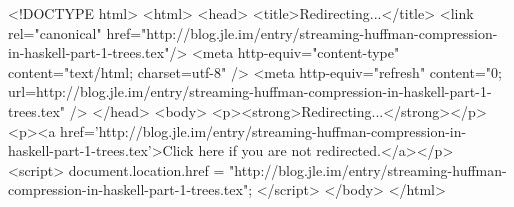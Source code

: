 <!DOCTYPE html>
<html>
<head>
<title>Redirecting...</title>
<link rel="canonical" href="http://blog.jle.im/entry/streaming-huffman-compression-in-haskell-part-1-trees.tex"/>
<meta http-equiv="content-type" content="text/html; charset=utf-8" />
<meta http-equiv="refresh" content="0; url=http://blog.jle.im/entry/streaming-huffman-compression-in-haskell-part-1-trees.tex" />
</head>
<body>
  <p><strong>Redirecting...</strong></p>
  <p><a href='http://blog.jle.im/entry/streaming-huffman-compression-in-haskell-part-1-trees.tex'>Click here if you are not redirected.</a></p>
  <script>
    document.location.href = "http://blog.jle.im/entry/streaming-huffman-compression-in-haskell-part-1-trees.tex";
  </script>
</body>
</html>
